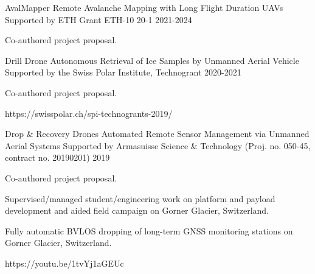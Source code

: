 \label{sec:proj}
\begin{cventries}

  \cvprojwideentry
  	{AvalMapper} %
  	{Remote Avalanche Mapping with Long Flight Duration UAVs} %
    {Supported by ETH Grant ETH-10 20-1} %
    {2021-2024} %
    {
      \begin{cvitems} %
        \item {Co-authored project proposal.}
      \end{cvitems}
    } %
    {} %
    {\showprojectdescriptions}
    {}

  \cvprojwideentry
  	{Drill Drone} %
  	{Autonomous Retrieval of Ice Samples by Unmanned Aerial Vehicle} %
    {Supported by the Swiss Polar Institute, Technogrant} %
    {2020-2021} %
    {
      \begin{cvitems} %
        \item {Co-authored project proposal.}
      \end{cvitems}
    } %
    {https://swisspolar.ch/spi-technogrants-2019/} %
    {\showprojectdescriptions}
    {}
    
  \cvprojwideentry
  	{Drop \& Recovery Drones} %
  	{Automated Remote Sensor Management via Unmanned Aerial Systems} %
    {Supported by Armasuisse Science \& Technology (Proj. no. 050-45, contract no. 20190201)} %
    {2019} %
    {
      \begin{cvitems} %
        \item {Co-authored project proposal.}
        \item {Supervised/managed student/engineering work on platform and payload development and aided field campaign on Gorner Glacier, Switzerland.}
        \item {Fully automatic BVLOS dropping of long-term GNSS monitoring stations on Gorner Glacier, Switzerland.}
      \end{cvitems}
    } %
    {https://youtu.be/1tvYj1aGEUc} %
    {\showprojectdescriptions}
    {}


\end{cventries}
